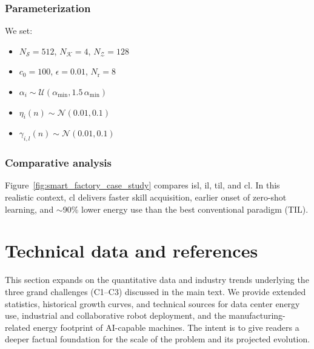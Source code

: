 \subsubsection{Parameterization}
We set:
\begin{itemize}
    \item $N_\mathcal{S} = 512$, $N_\mathcal{K} = 4$, $N_\mathcal{Z} = 128$
    \item $c_0 = 100$, $\epsilon = 0.01$, $N_\mathrm{r} = 8$
    \item $\alpha_i \sim \mathcal{U}(\alpha_\mathrm{min}, 1.5\,\alpha_\mathrm{min})$
    \item $\eta_i(n) \sim \mathcal{N}(0.01, 0.1)$
    \item $\gamma_{i,l}(n) \sim \mathcal{N}(0.01, 0.1)$
\end{itemize}

\subsubsection{Comparative analysis}
Figure~\ref{fig:smart_factory_case_study} compares \ac{isl}, \ac{il}, \ac{til}, and \ac{cl}. In this realistic context, \ac{cl} delivers faster skill acquisition, earlier onset of zero-shot learning, and $\sim$90\% lower energy use than the best conventional paradigm (TIL).



\newpage
\section{Technical data and references}\label{sec:technical_data_and_references}
This section expands on the quantitative data and industry trends underlying the three grand challenges (C1–C3) discussed in the main text. We provide extended statistics, historical growth curves, and technical sources for data center energy use, industrial and collaborative robot deployment, and the manufacturing-related energy footprint of AI-capable machines. The intent is to give readers a deeper factual foundation for the scale of the problem and its projected evolution.

